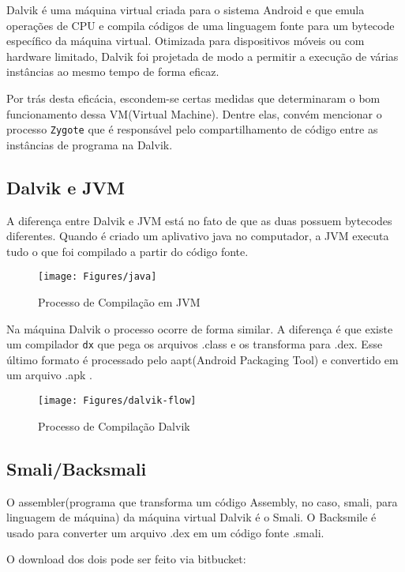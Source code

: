 \documentclass[hidelinks,12pt]{article}
\begin{document}
	Dalvik é uma máquina virtual criada para o sistema Android e que emula operações de CPU e compila códigos de uma linguagem fonte para um bytecode específico da máquina virtual. Otimizada para dispositivos móveis ou com hardware limitado, Dalvik foi projetada de modo a permitir a execução de várias instâncias ao mesmo tempo de forma eficaz.
	
	Por trás desta eficácia, escondem-se certas medidas que determinaram o bom funcionamento dessa VM(Virtual Machine). Dentre elas, convém mencionar o processo {\texttt{Zygote}} que é responsável pelo compartilhamento de código entre as instâncias de programa na Dalvik.
	
	 \subsection{Dalvik e JVM}
	 
	 A diferença entre Dalvik e JVM está no fato de que as duas possuem bytecodes diferentes.
	 Quando é criado um aplivativo java no computador, a JVM executa tudo o que foi compilado a partir do código fonte.
	 
	 \begin{figure}[!h]
	 	\centering
	 	\texttt{[image: Figures/java]}
	 	\caption{Processo de Compilação em JVM}
	 \end{figure}
	
	Na máquina Dalvik o processo ocorre de forma similar. A diferença é que existe um compilador \texttt{dx} que pega os arquivos .class e os transforma para .dex. Esse último formato é processado pelo aapt(Android Packaging Tool) e convertido em um arquivo .apk .
	
	\begin{figure}[!h]
		\centering
		\texttt{[image: Figures/dalvik-flow]}
		\caption{Processo de Compilação Dalvik}
	\end{figure}
	
	
	
	\subsection{Smali/Backsmali}
	
	O assembler(programa que transforma um código Assembly, no caso, smali, para linguagem de máquina) da máquina virtual Dalvik é o Smali. O Backsmile é usado para converter um arquivo .dex em um código fonte .smali.
	
	O download dos dois pode ser feito via bitbucket:\\
	
\end{document}
